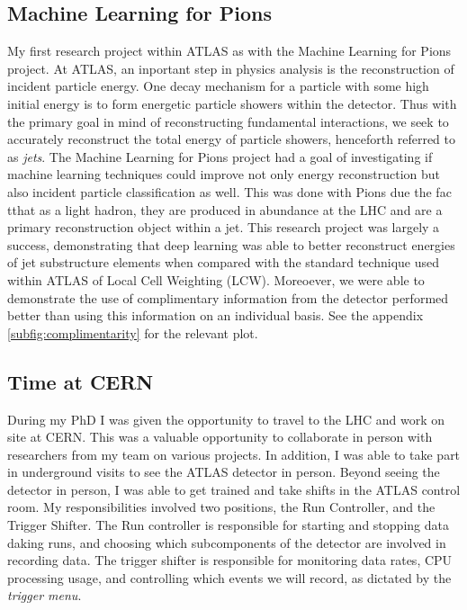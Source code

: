 \documentclass[12pt]{article}
\begin{document}
\subsection{Machine Learning for Pions}
My first research project within ATLAS as with the Machine Learning for Pions
project. At ATLAS, an inportant step in physics analysis is the reconstruction
of incident particle energy. One decay mechanism for a particle with some high
initial energy is to form energetic particle showers within the detector. Thus
with the primary goal in mind of reconstructing fundamental interactions, we
seek to accurately reconstruct the total energy of particle showers, henceforth
referred to as \textit{jets}. The Machine Learning for Pions project had a goal
of investigating if machine learning techniques could improve not only energy
reconstruction but also incident particle classification as well. This was done
with Pions due the fac tthat as a light hadron, they are produced in abundance
at the LHC and are a primary reconstruction object within a jet. This research
project was largely a success, demonstrating that deep learning was able to
better reconstruct energies of jet substructure elements when compared with the
standard technique used within ATLAS of Local Cell Weighting (LCW). Moreoever,
we were able to demonstrate the use of complimentary information from the
detector performed better than using this information on an individual basis.
See the appendix \ref{subfig:complimentarity} for the relevant plot.

\subsection{Time at CERN}
During my PhD I was given the opportunity to travel to the LHC and work on site
at CERN. This was a valuable opportunity to collaborate in person with
researchers from my team on various projects. In addition, I was able to take
part in underground visits to see the ATLAS detector in person. Beyond seeing
the detector in person, I was able to get trained and take shifts in the ATLAS
control room. My responsibilities involved two positions, the Run Controller,
and the Trigger Shifter. The Run controller is responsible for starting and
stopping data daking runs, and choosing which subcomponents of the detector are
involved in recording data. The trigger shifter is responsible for monitoring
data rates, CPU processing usage, and controlling which events we will record,
as dictated by the \textit{trigger menu}.
\end{document}
